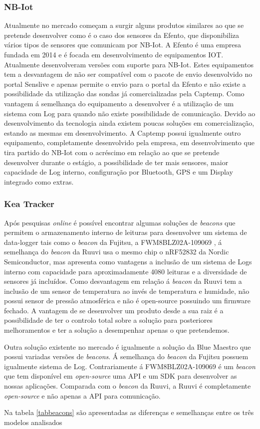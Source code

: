 \subsubsection{NB-Iot}
\par
Atualmente no mercado começam a surgir alguns produtos similares ao que se pretende desenvolver como é o caso dos sensores da Efento\cite{epoka}, que disponibiliza vários tipos de sensores que comunicam por NB-Iot. A Efento é uma empresa fundada em 2014 e é focada em desenvolvimento de equipamentos IOT. Atualmente desenvolveram versões com suporte para NB-Iot. Estes equipamentos tem a desvantagem de não ser compatível com o pacote de envio desenvolvido no portal Senslive e apenas permite o envio para o portal da Efento e não existe a possibilidade da utilização das sondas já comercializadas pela Captemp. Como vantagem á semelhança do equipamento a desenvolver é a utilização de um sistema com Log para quando não existe possibilidade de comunicação.
Devido ao desenvolvimento da tecnologia ainda existem poucas soluções em comercialização, estando as mesmas em desenvolvimento. A Captemp possui igualmente outro equipamento, completamente desenvolvido pela empresa, em desenvolvimento que tira partido do NB-Iot com o acréscimo em relação ao que se pretende desenvolver durante o estágio, a possibilidade de ter mais sensores, maior capacidade de Log interno, configuração por Bluetooth, GPS e um Display integrado como extras.


\subsubsection{Kea Tracker}
Após pesquisas \textit{online} é possível encontrar algumas soluções de \textit{beacons} que permitem o armazenamento interno de leituras para desenvolver um sistema de data-logger tais como o \textit{beacon} da Fujitsu, a FWM8BLZ02A-109069\cite{beacon1} , á semelhança do \textit{beacon} da Ruuvi usa o mesmo chip o nRF52832 da Nordic Semiconductor, mas apresenta como vantagens a inclusão de um sistema de Logs interno com capacidade para aproximadamente 4080 leituras e a diversidade de sensores já incluídos. Como desvantagem em relação á \textit{beacon} da Ruuvi tem a inclusão de um sensor de temperatura ao invés de temperatura e humidade, não possui sensor de pressão atmosférica e não é open-source possuindo um firmware fechado. A vantagem de se desenvolver um produto desde a sua raiz é a possibilidade de ter o controlo total sobre a solução para posteriores melhoramentos e ter a solução a desempenhar apenas o que pretendemos.
\par
Outra solução existente no mercado é igualmente a solução da Blue Maestro que possui variadas versões de \textit{beacons}. Á semelhança do \textit{beacon} da Fujitsu possuem igualmente sistema de Log. Contrariamente á FWM8BLZ02A-109069 é um \textit{beacon} que tem disponível em \textit{open-source} uma API e um SDK para desenvolver as nossas aplicações. Comparada com o \textit{beacon} da Ruuvi, a Ruuvi é completamente \textit{open-source} e não apenas a API para comunicação.
\par
Na tabela \ref{tabbeacons} são apresentadas as diferenças e semelhanças entre os três modelos analisados

